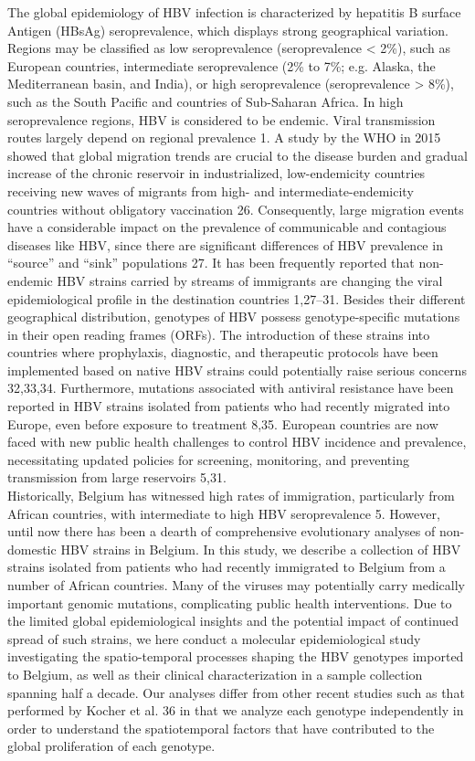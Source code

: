 The global epidemiology of HBV infection is characterized by hepatitis B surface Antigen (HBsAg) seroprevalence, which displays strong geographical variation. Regions may be classified as low seroprevalence (seroprevalence < 2\%), such as European countries, intermediate seroprevalence (2\% to 7\%; e.g. Alaska, the Mediterranean basin, and India), or high seroprevalence (seroprevalence > 8\%), such as the South Pacific and countries of Sub-Saharan Africa. In high seroprevalence regions, HBV is considered to be endemic. Viral transmission routes largely depend on regional prevalence 1. A study by the WHO in 2015 showed that global migration trends are crucial to the disease burden and gradual increase of the chronic reservoir in industrialized, low-endemicity countries receiving new waves of migrants from high- and intermediate-endemicity countries without obligatory vaccination 26. Consequently, large migration events have a considerable impact on the prevalence of communicable and contagious diseases like HBV, since there are significant differences of HBV prevalence in “source” and “sink” populations 27. It has been frequently reported that non-endemic HBV strains carried by streams of immigrants are changing the viral epidemiological profile in the destination countries 1,27–31. Besides their different geographical distribution, genotypes of HBV possess genotype-specific mutations in their open reading frames (ORFs). The introduction of these strains into countries where prophylaxis, diagnostic, and therapeutic protocols have been implemented based on native HBV strains could potentially raise serious concerns 32,33,34. Furthermore, mutations associated with antiviral resistance have been reported in HBV strains isolated from patients who had recently migrated into Europe, even before exposure to treatment 8,35. European countries are now faced with new public health challenges to control HBV incidence and prevalence, necessitating updated policies for screening, monitoring, and preventing transmission from large reservoirs 5,31.\\

Historically, Belgium has witnessed high rates of immigration, particularly from African countries, with intermediate to high HBV seroprevalence 5. However, until now there has been a dearth of comprehensive evolutionary analyses of non-domestic HBV strains in Belgium. In this study, we describe a collection of HBV strains isolated from patients who had recently immigrated to Belgium from a number of African countries. Many of the viruses may potentially carry medically important genomic mutations, complicating public health interventions. Due to the limited global epidemiological insights and the potential impact of continued spread of such strains, we here conduct a molecular epidemiological study investigating the spatio-temporal processes shaping the HBV genotypes imported to Belgium, as well as their clinical characterization in a sample collection spanning half a decade. Our analyses differ from other recent studies such as that performed by Kocher et al. 36 in that we analyze each genotype independently in order to understand the spatiotemporal factors that have contributed to the global proliferation of each genotype.

